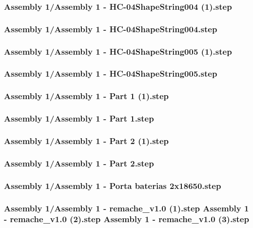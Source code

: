 \documentclass[a4paper,12pt]{article}
\begin{document}
\subsubsection{Assembly 1/Assembly 1 - HC-04ShapeString004 (1).step}

\subsubsection{Assembly 1/Assembly 1 - HC-04ShapeString004.step}

\subsubsection{Assembly 1/Assembly 1 - HC-04ShapeString005 (1).step}

\subsubsection{Assembly 1/Assembly 1 - HC-04ShapeString005.step}

\subsubsection{Assembly 1/Assembly 1 - Part 1 (1).step}

\subsubsection{Assembly 1/Assembly 1 - Part 1.step}

\subsubsection{Assembly 1/Assembly 1 - Part 2 (1).step}

\subsubsection{Assembly 1/Assembly 1 - Part 2.step}

\subsubsection{Assembly 1/Assembly 1 - Porta baterias 2x18650.step}

\subsubsection{Assembly 1/Assembly 1 - remache_v1.0 (1).step          Assembly 1 - remache_v1.0 (2).step          Assembly 1 - remache_v1.0 (3).step}

\end{document}
